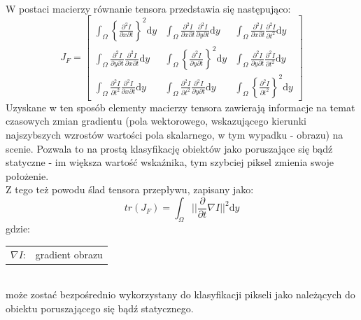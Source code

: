 \paragraph{}
W postaci macierzy równanie tensora przedstawia się następująco:
\begin{equation}
\label{eq:FT}
J_{F} =
\begin{bmatrix}
%
\int_\Omega \left\{\frac{\partial^2I}{\partial x\partial t}\right\}^2 \mathrm{d}y   &
%
\int_\Omega \frac{\partial^2I}{\partial x\partial t} \frac{\partial^2I}{\partial y\partial t} \mathrm{d}y  &
%
\int_\Omega \frac{\partial^2I}{\partial x\partial t} \frac{\partial^2I}{\partial t^2} \mathrm{d}y
\\[0.5em]
%
%
\int_\Omega \frac{\partial^2I}{\partial y\partial t} \frac{\partial^2I}{\partial x\partial t} \mathrm{d}y  &
%
\int_\Omega \left\{\frac{\partial^2I}{\partial y\partial t}\right\}^2 \mathrm{d}y   &
%
\int_\Omega \frac{\partial^2I}{\partial y\partial t} \frac{\partial^2I}{\partial t^2} \mathrm{d}y
\\[0.5em]
%
%
\int_\Omega \frac{\partial^2I}{\partial t^2} \frac{\partial^2I}{\partial x\partial t} \mathrm{d}y   &
%
\int_\Omega \frac{\partial^2I}{\partial t^2} \frac{\partial^2I}{\partial y\partial t} \mathrm{d}y   &
%
\int_\Omega \left\{\frac{\partial^2I}{\partial t^2}\right\}^2 \mathrm{d}y
\end{bmatrix}
\end{equation}
Uzyskane w ten sposób elementy macierzy tensora zawierają informacje na temat czasowych zmian gradientu (pola wektorowego, wskazującego kierunki najszybszych wzrostów wartości pola skalarnego, w tym wypadku - obrazu) na scenie. Pozwala to na prostą klasyfikację obiektów jako poruszające się bądź statyczne - im większa wartość wskaźnika, tym szybciej piksel zmienia swoje położenie.\\
Z tego też powodu ślad tensora przepływu, zapisany jako:
\begin{equation}
tr(J_{F}) = 
\int_\Omega ||\frac{\partial}{\partial t}\nabla I||^2\mathrm{d}y
\end{equation}
gdzie:\\ 
\hspace*{3em}
\begin{tabular}{r l}
$\nabla I$: &  gradient obrazu
\end{tabular} \\
może zostać bezpośrednio wykorzystany do klasyfikacji pikseli jako należących do obiektu poruszającego się bądź statycznego.
